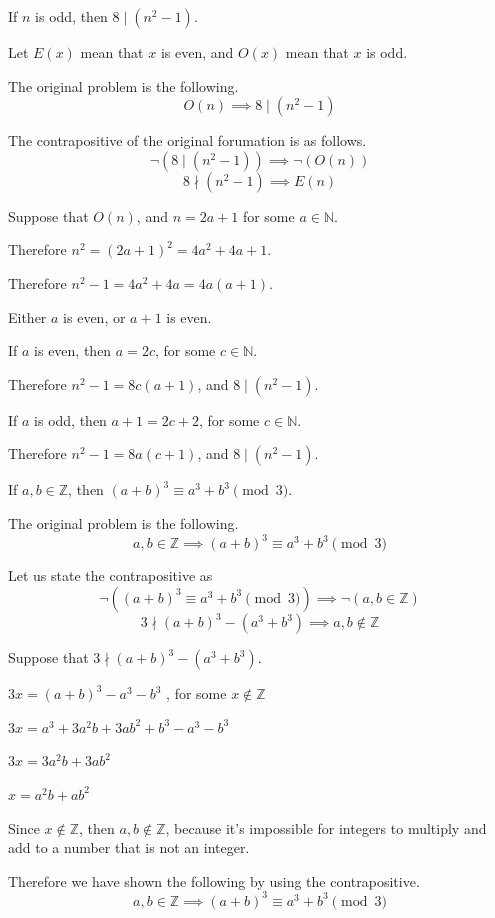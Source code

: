 \documentclass[openany, 12pt]{book}
\begin{document}
\begin{exercise}{}{}
	If $n$ is odd, then $8 \mid (n^2-1)$.
	\begin{alist}
		\item Let $E(x)$ mean that $x$ is even, and $O(x)$ mean that $x$ is odd.
		\item The original problem is the following.
		$$
			O(n)
			\implies
			8 \mid (n^2-1)
		$$
		\item The contrapositive of the original forumation is as follows.
		$$
			\neg(8 \mid (n^2-1))
			\implies
			\neg(O(n))
		$$
		$$
			8 \nmid (n^2-1)
			\implies
			E(n)
		$$
		\item Suppose that $O(n)$, and $n=2a+1$ for some $a \in \mathbb{N}$.
		\item Therefore $n^2=(2a+1)^2= 4a^2+4a+1$.
		\item Therefore $n^2-1= 4a^2+4a = 4a(a+1)$.
		\item Either $a$ is even, or $a+1$ is even.
		\item If $a$ is even, then $a=2c$, for some $c \in \mathbb{N}$.
		\item Therefore $n^2-1 = 8c(a+1)$, and $8 \mid (n^2-1)$.
		\item If $a$ is odd, then $a+1=2c+2$, for some $c \in \mathbb{N}$.
		\item Therefore $n^2-1 = 8a(c+1)$, and $8 \mid (n^2-1)$.
	\end{alist}
\end{exercise}

\begin{exercise}{}{}
	If $a,b \in \mathbb{Z}$, then $(a+b)^3 \equiv a^3 + b^3
		\pmod 3$.
	\begin{alist}
		\item The original problem is the following.
		$$
			a,b \in \mathbb{Z}
			\implies
			(a+b)^3 \equiv a^3 + b^3 \pmod 3
		$$
		\item Let us state the contrapositive as
		$$
			\neg\left((a+b)^3 \equiv a^3 + b^3 \pmod 3\right)
			\implies
			\neg(a,b \in \mathbb{Z})
		$$
		$$
			3 \nmid (a+b)^3 - (a^3 + b^3)
			\implies
			a,b \notin \mathbb{Z}
		$$
		\item Suppose that $3 \nmid (a+b)^3 - (a^3 + b^3)$.
		\item $3x = (a+b)^3 - a^3 - b^3$ , for some $x \notin \mathbb{Z}$
		\item $3x = a^3 + 3a^2b + 3ab^2 + b^3 - a^3 - b^3$
		\item $3x = 3a^2b + 3ab^2$
		\item $x = a^2b + ab^2$
		\item Since $x \notin \mathbb{Z}$, then $a, b \notin \mathbb{Z}$, because
		it's impossible for integers to multiply and add to a number that is not
		an integer.
		\item Therefore we have shown the following by using the contrapositive.
		$$
			a,b \in \mathbb{Z}
			\implies
			(a+b)^3 \equiv a^3 + b^3 \pmod 3
		$$
		\item
	\end{alist}
\end{exercise}
\end{document}
